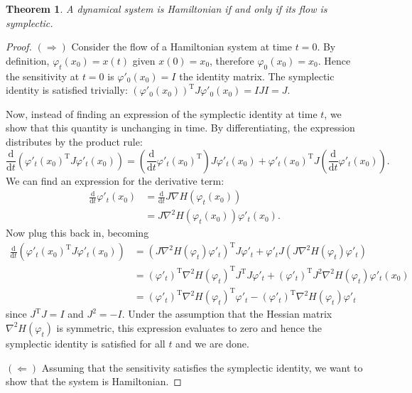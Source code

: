 \documentclass{report}
\newtheorem{theorem}{Theorem}[chapter]
\theoremstyle{exampstyle} \newtheorem{example}[theorem]{Example}
\theoremstyle{exampstyle} \newtheorem{remark}[theorem]{Remark}
\theoremstyle{exampstyle} \newtheorem{definition}[theorem]{Definition}
\theoremstyle{exampstyle} \newtheorem{lemma}[theorem]{Lemma}
\begin{document}
\begin{theorem}
\label{thm:hamil}
A dynamical system is Hamiltonian if and only if its flow is symplectic.
\end{theorem}
\begin{proof}
$(\Rightarrow)$ Consider the flow of a Hamiltonian system at time $t=0$. By definition, $\varphi_t(x_0) = x(t)$ given $x(0) = x_0$,
therefore $\varphi_0(x_0) = x_0$. Hence the sensitivity at $t=0$ is $\varphi'_0(x_0) = I$ the identity matrix.
The symplectic identity is satisfied trivially: $(\varphi'_0(x_0))^\mathrm{T} J \varphi'_0(x_0) = IJI = J$.

Now, instead of finding an expression of the symplectic identity at time $t$,
we show that this quantity is unchanging in time.
By differentiating, the expression distributes by the product rule:
\begin{equation*}
	\frac{\mathrm{d}}{\mathrm{d}t} \left(
		\varphi'_t(x_0)^\mathrm{T} J \varphi'_t(x_0)
	\right) = \left(
		\frac{\mathrm{d}}{\mathrm{d}t} \varphi'_t(x_0)^\mathrm{T}
	\right) J \varphi'_t(x_0) + \varphi'_t(x_0)^\mathrm{T} J \left(
		\frac{\mathrm{d}}{\mathrm{d}t} \varphi'_t(x_0)
	\right).
\end{equation*}
We can find an expression for the derivative term:
\begin{align*}
	\frac{\mathrm{d}}{\mathrm{d}t} \varphi'_t(x_0) &= \frac{\mathrm{d}}{\mathrm{d}t} J \nabla H(\varphi_t(x_0)) \\
	&= J \nabla^2 H(\varphi_t(x_0)) \varphi'_t(x_0).
\end{align*}
Now plug this back in, becoming
\begin{align*}
	\frac{\mathrm{d}}{\mathrm{d}t} \left(
		\varphi'_t(x_0)^\mathrm{T} J \varphi'_t(x_0)
	\right) &= \left( J \nabla^2 H(\varphi_t)\varphi'_t \right)^\mathrm{T} J \varphi'_t 
	+ \varphi'_t J \left( 
		J \nabla^2 H(\varphi_t) \varphi'_t
  	\right) \\
	&= (\varphi'_t)^\mathrm{T} \nabla^2 H(\varphi_t)^\mathrm{T} J^\mathrm{T} J \varphi'_t
	+ (\varphi'_t)^\mathrm{T} J^2 \nabla^2 H(\varphi_t) \varphi'_t(x_0) \\
	&= (\varphi'_t)^\mathrm{T} \nabla^2 H(\varphi_t)^\mathrm{T} \varphi'_t - (\varphi'_t)^\mathrm{T} \nabla^2 H(\varphi_t) \varphi'_t
\end{align*}
since $J^\mathrm{T}J = I$ and $J^2 = -I$.
Under the assumption that the Hessian matrix $\nabla^2 H(\varphi_t)$ is symmetric,
this expression evaluates to zero and hence the symplectic identity is satisfied for all $t$ and we are done.

$(\Leftarrow)$ Assuming that the sensitivity satisfies the symplectic identity, we want to show that the system is Hamiltonian.

\end{proof}
\end{document}
